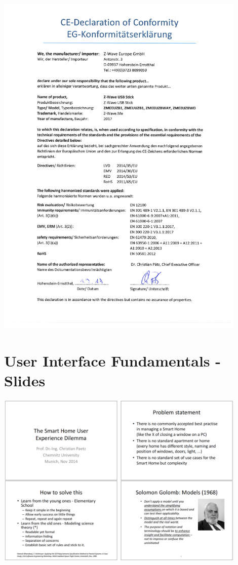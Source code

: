 \includegraphics[width=0.9\textwidth]{pdfs/CE_UZB.pdf}
 
\chapter{User Interface Fundamentals - Slides}
\label{slides}


\includegraphics[width=0.9\textwidth]{pngs/funslides1.png}


